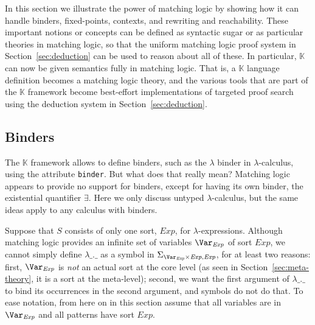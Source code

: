 \documentclass[UTF8,11pt]{article}
\theoremstyle{plain}
\theoremstyle{definition}
\theoremstyle{remark}
\newcommand{\K}{\mbox{$\mathbb{K}$}\xspace}
\newcommand{\Exp}{\textit{Exp}}
\begin{document}
In this section we illustrate the power of matching logic by showing how it can
handle binders, fixed-points, contexts, and rewriting and reachability.
These important notions or concepts can be defined as syntactic sugar or as
particular theories in matching logic, so that the uniform matching logic proof
system in Section~\ref{sec:deduction} can be used to reason about all of these.
In particular, \K can now be given semantics fully in matching logic.
That is, a \K language definition becomes a matching logic theory, and the
various tools that are part of the \K framework become best-effort
implementations of targeted proof search using the deduction system in
Section~\ref{sec:deduction}.

\subsection{Binders}
\label{sec:binders}


The \K framework allows to define binders, such as the $\lambda$ binder in
$\lambda$-calculus, using the attribute \texttt{binder}.
But what does that really mean?
Matching logic appears to provide no support for binders, except for having
its own binder, the existential quantifier $\exists$.
Here we only discuss untyped $\lambda$-calculus, but the same ideas apply to
any calculus with binders.

Suppose that $S$ consists of only one sort, $\Exp$, for $\lambda$-expressions.
Although matching logic provides an infinite set of variables $\Var_\Exp$ of
sort $\Exp$, we cannot simply define $\lambda\_.\_$ as a symbol in
$\Sigma_{\Var_\Exp \times \Exp, \Exp}$, for at least two reasons:
first, $\Var_\Exp$ is \emph{not} an actual sort at the core level
(as seen in Section~\ref{sec:meta-theory}, it is a sort at the meta-level);
second, we want the first argument of $\lambda\_.\_$ to bind its occurrences
in the second argument, and symbols do not do that.
To ease notation, from here on in this section assume that all variables
are in $\Var_\Exp$ and all patterns have sort $\Exp$.
\end{document}
